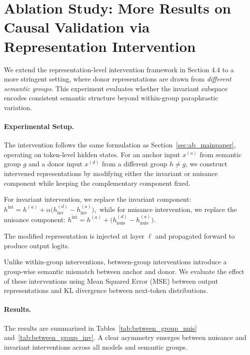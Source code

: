 \section{Ablation Study: More Results on Causal Validation via Representation Intervention}
\label{append: between_group}

We extend the representation-level intervention framework in Section 4.4 to a more stringent setting, where donor representations are drawn from \emph{different semantic groups}. This experiment evaluates whether the invariant subspace encodes consistent semantic structure beyond within-group paraphrastic variation.

\vspace{-0.8em}
\paragraph{Experimental Setup.}
The intervention follows the same formulation as Section~\ref{sec:ab_mainpaper}, operating on token-level hidden states. For an anchor input $x^{(a)}$ from semantic group $g$ and a donor input $x^{(d)}$ from a different group $h \neq g$, we construct intervened representations by modifying either the invariant or nuisance component while keeping the complementary component fixed.

For invariant intervention, we replace the invariant component:
\(
h^{\text{int}} = h^{(a)} + \alpha \big(h^{(d)}_{\text{inv}} - h^{(a)}_{\text{inv}}\big),
\)
while for nuisance intervention, we replace the nuisance component:
\(
h^{\text{int}} = h^{(a)} + \big(h^{(d)}_{\text{nuis}} - h^{(a)}_{\text{nuis}}\big).
\)

The modified representation is injected at layer $\ell$ and propagated forward to produce output logits.

Unlike within-group interventions, between-group interventions introduce a group-wise semantic mismatch between anchor and donor. We evaluate the effect of these interventions using Mean Squared Error (MSE) between output representations and KL divergence between next-token distributions.



\paragraph{Results.}
The results are summarized in Tables~\ref{tab:between_group_nuis} and~\ref{tab:between_group_inv}. A clear asymmetry emerges between nuisance and invariant interventions across all models and semantic groups.

